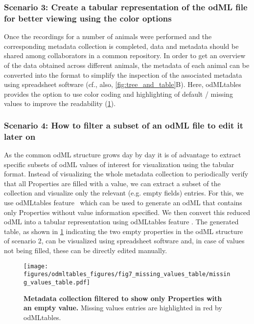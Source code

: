 {\subsubsection*{Scenario 3: Create a tabular representation of the odML file for better viewing using the color options}
Once the recordings for a number of animals were performed and the corresponding metadata collection is completed, data and metadata should be shared among collaborators in a common repository. In order to get an overview of the data obtained across different animals, the metadata of each animal can be converted into the  format to simplify the inspection of the associated metadata using spreadsheet software (cf., also, \cref{fig:tree_and_table}B). Here, odMLtables provides the option to use color coding and highlighting of default / missing values to improve the readability (\cref{fig:missing_values_table}).

\subsubsection*{Scenario 4: How to filter a subset of an odML file to edit it later on}
As the common odML structure grows day by day it is of advantage to extract specific subsets of odML values of interest for visualization using the tabular format. Instead of visualizing the whole metadata collection to periodically verify that all Properties are filled with a value, we can extract a subset of the collection and visualize only the relevant (e.g. empty fields) entries. For this, we use odMLtables feature \ffilter\ which can be used to generate an odML that contains only Properties without value information specified. We then convert this reduced odML into a tabular  representation using odMLtables feature \fconvert. The generated table, as shown in \cref{fig:missing_values_table} indicating the two empty properties in the odML structure of scenario 2, can be visualized using spreadsheet software and, in case of values not being filled, these can be directly edited manually.

\begin{figure}[!ht]
\begin{center}
\texttt{[image: figures/odmltables\_figures/fig7\_missing\_values\_table/missing\_values\_table.pdf]}
\caption[Metadata collection filtered to show only Properties with an empty value]{\label{fig:missing_values_table}
\textbf{Metadata collection filtered to show only Properties with an empty value.} Missing values entries are highlighted in red by odMLtables.}
\end{center}
\end{figure}

}
